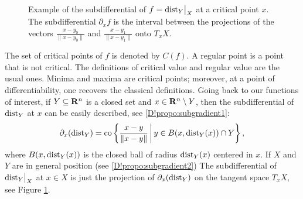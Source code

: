 \begin{figure}[tbp]
  \centering
  \caption{Example of the subdifferential of $f = \mathord{\operatorname{dist}}_Y\big|_X$ at a critical point $x$. The subdifferential $\partial_x f$ is the interval between the projections of the vectors $\frac{x - y_0}{\| x - y_0 \|}$ and $\frac{x - y_1}{\| x - y_1 \|}$ onto $T_x X$.}
  \label{D!F:distance-subdifferentialintro}
\end{figure}

The set of critical points of $f$ is denoted by $C(f)$. A regular point is a point that is not critical.  
The definitions of critical value and regular value are the usual ones. Minima and maxima are critical points; moreover, at a point of differentiability, one recovers the classical definitions. Going back to our functions of interest, if $Y \subseteq \mathbf{R}^n$ is a closed set and $x \in \mathbf{R}^n \setminus Y$, then the subdifferential of $\operatorname{dist}_Y$ at $x$ can be easily described, see \cref{D!propo:subgradient1}:
\begin{equation}
\label{D!eq:subintro}
  \partial_x(\operatorname{dist}_Y) = \mathrm{co}\left\{
    \frac{x - y}{\|x - y\|} \,\middle|\, y \in B(x, \operatorname{dist}_Y(x)) \cap Y
  \right\},
\end{equation}
where $B(x, \operatorname{dist}_Y(x))$ is the closed ball of radius $\operatorname{dist}_Y(x)$ centered in $x$.
If $X$ and $Y$ are in general position (see \cref{D!propo:subgradient2}) The subdifferential of $\mathord{\operatorname{dist}}_Y\big|_X$ at $x\in X$ is just the projection of $\partial_x(\operatorname{dist}_Y) $ on the tangent space $T_xX$, see Figure \ref{D!F:distance-subdifferentialintro}.

